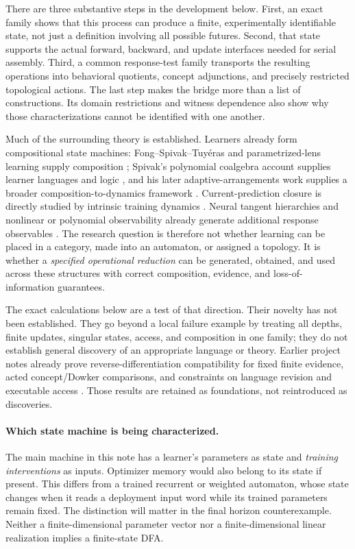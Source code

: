 \documentclass[11pt]{article}
\theoremstyle{definition}\newtheorem{definition}[theorem]{Definition}
\theoremstyle{remark}\newtheorem{remark}[theorem]{Remark}
\begin{document}
There are three substantive steps in the development below. First, an exact
family shows that this process can produce a finite, experimentally identifiable
state, not just a definition involving all possible futures. Second, that state
supports the actual forward, backward, and update interfaces needed for serial
assembly. Third, a common response-test family transports the resulting
operations into behavioral quotients, concept adjunctions, and precisely
restricted topological actions. The last step makes the bridge more than a
list of constructions. Its domain restrictions and witness dependence also
show why those characterizations cannot be identified with one another.

Much of the surrounding theory is established. Learners already form
compositional state machines: Fong--Spivak--Tuy\'eras and parametrized-lens
learning supply composition \cite{fong,cruttwell}; Spivak's polynomial
coalgebra account supplies learner languages and logic
\cite{spivaklanguages}, and his later adaptive-arrangements work supplies a
broader composition-to-dynamics framework \cite{spivak2026}. Current-prediction
closure is directly studied by intrinsic training dynamics
\cite{marcotte}. Neural tangent hierarchies and nonlinear or polynomial
observability already generate additional response observables
\cite{jacot,huang,hermann,boreale,sontag}. The research question is therefore
not whether learning can be placed in a category, made into an automaton,
or assigned a topology. It is whether a \emph{specified operational reduction}
can be generated, obtained, and used across these structures with correct
composition, evidence, and loss-of-information guarantees.

The exact calculations below are a test of that direction. Their novelty has
not been established. They go beyond a local failure example by treating all
depths, finite updates, singular states, access, and composition in one family;
they do not establish general discovery of an appropriate language or theory.
Earlier project notes already prove reverse-differentiation compatibility for
fixed finite evidence, acted concept/Dowker comparisons, and constraints on
language revision and executable access \cite{project}. Those results are
retained as foundations, not reintroduced as discoveries.

\paragraph{Which state machine is being characterized.}
The main machine in this note has a learner's parameters as state and
\emph{training interventions} as inputs. Optimizer memory would also belong
to its state if present. This differs from a trained recurrent or weighted
automaton, whose state changes when it reads a deployment input word while
its trained parameters remain fixed. The distinction will matter in the
final horizon counterexample. Neither a finite-dimensional parameter vector
nor a finite-dimensional linear realization implies a finite-state DFA.
\end{document}
